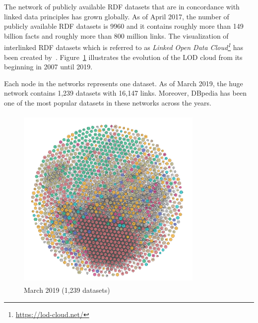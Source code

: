 The network of publicly available RDF datasets that are in concordance with linked data principles has grown globally. As of April 2017, the number of publicly available RDF datasets is 9960 and it contains roughly more than 149 billion facts and roughly more than 800 million links.%
The visualization of interlinked RDF datasets which is referred to as \textit{Linked Open Data Cloud\footnote{\url{https://lod-cloud.net/}}} has been  created by~\citeauthor{LOD_cloud}.  Figure~\ref{fig:lod_cloud} illustrates the evolution of the LOD cloud from its beginning in 2007 until 2019.  

Each node in the networks represents one dataset. As of March 2019, the huge network contains 1,239 datasets with 16,147 links. Moreover, DBpedia has been one of the most popular datasets in these networks across the years. 
\newpage

\vspace{10cm}

%
\clearpage

\begin{figure}[t!]
\centering
\captionsetup{justification=centering,margin=2cm}
 \includegraphics[height=9cm,width=9cm]{Figures/LOD/fig_LOD_2019_clean.png}
 \caption{March 2019 (1,239 datasets)}
 \label{fig:lod_cloud}
\end{figure}



